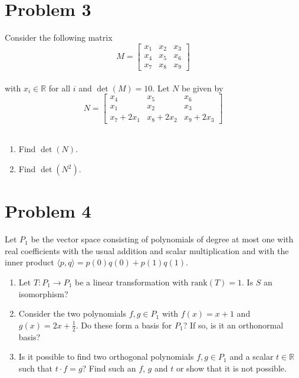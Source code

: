 \documentclass[a4paper,10pt]{article}
\def\R{\mathbb R}
\begin{document}
\section*{Problem 3}
Consider the following matrix
$$
M=\left[ \begin{array}{ccc} x_1 & x_2 & x_3 \\ x_4 & x_5 & x_6 \\ x_7 & x_8 & x_9  \end{array} \right]
$$ \\
with $x_i \in \R$ for all $i$ and $\det(M)=10$.
Let $N$ be given by
$$
N=\left[ \begin{array}{ccc} x_4 & x_5 & x_6 \\ x_1 & x_2 & x_3 \\ x_7+2x_1 & x_8+2x_2 & x_9+2x_3  \end{array} \right]
$$ \\
\begin{enumerate}
\item Find $\det(N)$.
\item Find $\det(N^2)$.
\end{enumerate}



\section*{Problem 4}
Let $P_1$ be the vector space consisting of polynomials of degree at most one with real coefficients with
the usual addition and scalar multiplication and with the inner product $\langle p,q\rangle=p(0)q(0)+p(1)q(1)$.
\begin{enumerate}
\item Let $T: P_1 \to P_1$ be a linear transformation with $\text{rank}(T)=1$.
Is $S$ an isomorphism?
\item Consider the two polynomials $f,g \in P_1$ with $f(x)=x+1$ and $g(x)=2x+\frac12$.
Do these form a basis for $P_1$? If so, is it an orthonormal basis?
\item Is it possible to find two orthogonal polynomials $f,g\in P_1$ and a scalar $t\in \R$ such that 
$t \cdot f=g$? Find such an $f$, $g$ and $t$ or show that it is not possible.
\end{enumerate}

\newpage
\end{document}
